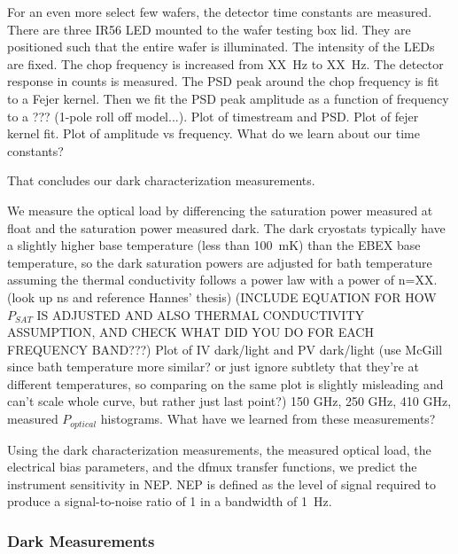 For an even more select few wafers, the detector time constants are measured. 
There are three IR56 LED mounted to the wafer testing box lid.
They are positioned such that the entire wafer is illuminated. 
The intensity of the LEDs are fixed. The chop frequency is increased from XX~Hz to XX~Hz. The detector response in counts is measured. The PSD peak around the chop frequency is fit to a Fejer kernel. 
Then we fit the PSD peak amplitude as a function of frequency to a ??? (1-pole roll off model...).
Plot of timestream and PSD. 
Plot of fejer kernel fit. 
Plot of amplitude vs frequency. 
What do we learn about our time constants?

That concludes our dark characterization measurements. 
 
We measure the optical load by differencing the saturation power measured at float and the saturation power measured dark. 
The dark cryostats typically have a slightly higher base temperature (less than 100~mK) than the \ac{EBEX} base temperature, so the dark saturation powers are adjusted for bath temperature assuming the thermal conductivity follows a power law with a power of n=XX. (look up ns and reference Hannes' thesis)
(INCLUDE EQUATION FOR HOW $P_{SAT}$ IS ADJUSTED AND ALSO THERMAL CONDUCTIVITY ASSUMPTION, AND CHECK WHAT DID YOU DO FOR EACH FREQUENCY BAND???)
Plot of IV dark/light and PV dark/light (use McGill since bath temperature more similar? or just ignore subtlety that they're at different temperatures, so comparing on the same plot is slightly misleading and can't scale whole curve, but rather just last point?)
150 GHz, 250 GHz, 410 GHz, measured $P_{optical}$ histograms.
What have we learned from these measurements?

Using the dark characterization measurements, the measured optical load, the electrical bias parameters, and the dfmux transfer functions, we predict the instrument sensitivity in \ac{NEP}. 
\ac{NEP} is defined as the level of signal required to produce a signal-to-noise ratio of 1 in a bandwidth of 1~Hz.  

\subsubsection{Dark Measurements}
\label{sec:dark_measurements}



